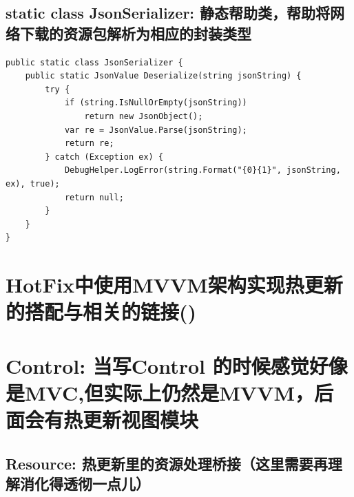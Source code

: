 \documentclass[9pt, b5paper]{article}
\begin{document}
\subsection{static class JsonSerializer: 静态帮助类，帮助将网络下载的资源包解析为相应的封装类型}
\label{sec-7-2}
\begin{verbatim}
public static class JsonSerializer {
    public static JsonValue Deserialize(string jsonString) {
        try {
            if (string.IsNullOrEmpty(jsonString)) 
                return new JsonObject();
            var re = JsonValue.Parse(jsonString);
            return re;
        } catch (Exception ex) {
            DebugHelper.LogError(string.Format("{0}{1}", jsonString, ex), true);
            return null;
        }
    }
}
\end{verbatim}
\section{HotFix中使用MVVM架构实现热更新的搭配与相关的链接()}
\label{sec-8}

\section{Control: 当写Control 的时候感觉好像是MVC,但实际上仍然是MVVM，后面会有热更新视图模块}
\label{sec-9}
\subsection{Resource: 热更新里的资源处理桥接（这里需要再理解消化得透彻一点儿）}
\label{sec-9-1}
\end{document}
